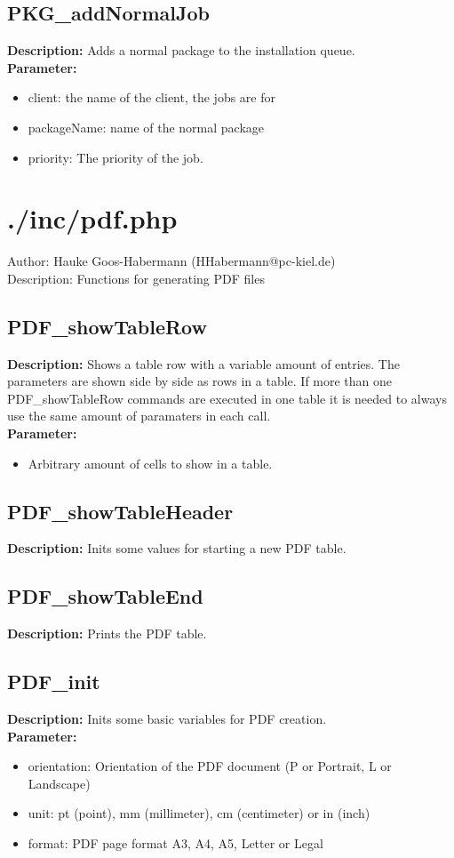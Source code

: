 \subsection{PKG\_addNormalJob}
\textbf{Description:} Adds a normal package to the installation queue.\\
\textbf{Parameter:}
\begin{itemize}
\item client: the name of the client, the jobs are for
\item packageName: name of the normal package
\item priority: The priority of the job.
\end{itemize}

\newpage\section{./inc/pdf.php}
 Author: Hauke Goos-Habermann (HHabermann@pc-kiel.de)\\
 Description: Functions for generating PDF files\\

\subsection{PDF\_showTableRow}
\textbf{Description:} Shows a table row with a variable amount of entries. The parameters are shown side by side as rows in a table. If more than one PDF\_showTableRow commands are executed in one table it is needed to always use the same amount of paramaters in each call.\\
\textbf{Parameter:}
\begin{itemize}
\item Arbitrary amount of cells to show in a table.
\end{itemize}

\subsection{PDF\_showTableHeader}
\textbf{Description:} Inits some values for starting a new PDF table.\\

\subsection{PDF\_showTableEnd}
\textbf{Description:} Prints the PDF table.\\

\subsection{PDF\_init}
\textbf{Description:} Inits some basic variables for PDF creation.\\
\textbf{Parameter:}
\begin{itemize}
\item orientation: Orientation of the PDF document (P or Portrait, L or Landscape)
\item unit: pt (point), mm (millimeter), cm (centimeter) or in (inch)
\item format: PDF page format A3, A4, A5, Letter or Legal
\end{itemize}

